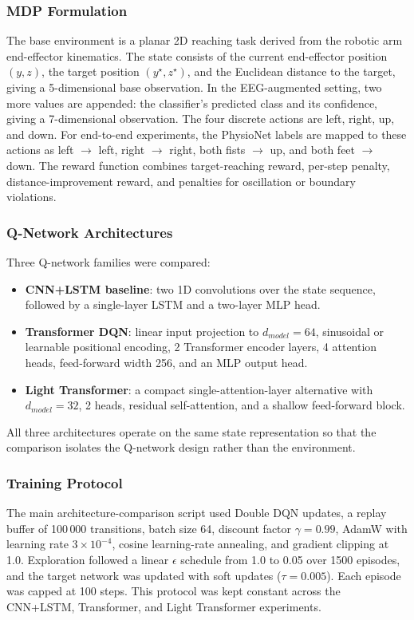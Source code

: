 \documentclass[12pt, a4paper]{article}
\begin{document}
\subsubsection{MDP Formulation}

The base environment is a planar 2D reaching task derived from the robotic arm end-effector kinematics. The state consists of the current end-effector position $(y, z)$, the target position $(y^\star, z^\star)$, and the Euclidean distance to the target, giving a 5-dimensional base observation. In the EEG-augmented setting, two more values are appended: the classifier's predicted class and its confidence, giving a 7-dimensional observation. The four discrete actions are left, right, up, and down. For end-to-end experiments, the PhysioNet labels are mapped to these actions as left $\rightarrow$ left, right $\rightarrow$ right, both fists $\rightarrow$ up, and both feet $\rightarrow$ down. The reward function combines target-reaching reward, per-step penalty, distance-improvement reward, and penalties for oscillation or boundary violations.

\subsubsection{Q-Network Architectures}

Three Q-network families were compared:
\begin{itemize}
    \item \textbf{CNN+LSTM baseline}: two 1D convolutions over the state sequence, followed by a single-layer LSTM and a two-layer MLP head.
    \item \textbf{Transformer DQN}: linear input projection to $d_{model}=64$, sinusoidal or learnable positional encoding, 2 Transformer encoder layers, 4 attention heads, feed-forward width 256, and an MLP output head.
    \item \textbf{Light Transformer}: a compact single-attention-layer alternative with $d_{model}=32$, 2 heads, residual self-attention, and a shallow feed-forward block.
\end{itemize}
All three architectures operate on the same state representation so that the comparison isolates the Q-network design rather than the environment.

\subsubsection{Training Protocol}

The main architecture-comparison script used Double DQN updates, a replay buffer of 100\,000 transitions, batch size 64, discount factor $\gamma = 0.99$, AdamW with learning rate $3 \times 10^{-4}$, cosine learning-rate annealing, and gradient clipping at 1.0. Exploration followed a linear $\epsilon$ schedule from 1.0 to 0.05 over 1500 episodes, and the target network was updated with soft updates ($\tau = 0.005$). Each episode was capped at 100 steps. This protocol was kept constant across the CNN+LSTM, Transformer, and Light Transformer experiments.
\end{document}
